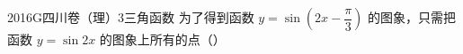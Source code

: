 
\begin{problem}{2016}{G}{四川卷（理）}{3}{三角函数}
为了得到函数 $ y = \sin\left(2x - \dfrac{\pi}{3}\right) $ 的图象，只需把函数 $ y = \sin 2x $ 的图象上所有的点（\hspace{1cm}）
\begin{choices}
\end{choices}
\end{problem}

\begin{answer}

\end{answer}

\begin{solutions}

\end{solutions}
